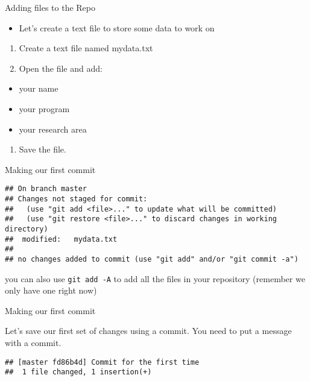 \documentclass[ignorenonframetext,]{beamer}
\providecommand{\tightlist}{%
  \setlength{\itemsep}{0pt}\setlength{\parskip}{0pt}}
\begin{document}
\begin{frame}{Adding files to the Repo}

\begin{itemize}
\tightlist
\item
  Let's create a text file to store some data to work on
\end{itemize}

\begin{enumerate}
\def\labelenumi{\arabic{enumi}.}
\item
  Create a text file named mydata.txt
\item
  Open the file and add:
\end{enumerate}

\begin{itemize}
\tightlist
\item
  your name
\item
  your program
\item
  your research area
\end{itemize}

\begin{enumerate}
\def\labelenumi{\arabic{enumi}.}
\setcounter{enumi}{2}
\tightlist
\item
  Save the file.
\end{enumerate}

\end{frame}

\begin{frame}[fragile]{Making our first commit}

\begin{verbatim}
## On branch master
## Changes not staged for commit:
##   (use "git add <file>..." to update what will be committed)
##   (use "git restore <file>..." to discard changes in working directory)
##  modified:   mydata.txt
## 
## no changes added to commit (use "git add" and/or "git commit -a")
\end{verbatim}

you can also use \texttt{git\ add\ -A} to add all the files in your
repository (remember we only have one right now)

\end{frame}

\begin{frame}[fragile]{Making our first commit}

Let's save our first set of changes using a commit. You need to put a
message with a commit.

\begin{verbatim}
## [master fd86b4d] Commit for the first time
##  1 file changed, 1 insertion(+)
\end{verbatim}

\end{frame}
\end{document}
